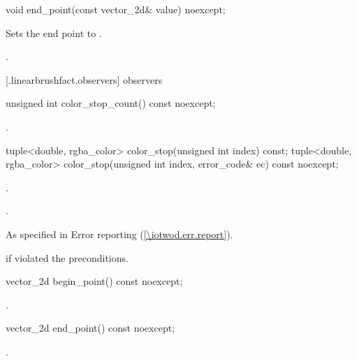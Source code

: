 \begin{itemdecl}
    void end_point(const vector_2d& value) noexcept;
\end{itemdecl}
\begin{itemdescr}
	\pnum
	\effects
	Sets the end point to .
	
	\pnum
	\postconditions
	.
	
\end{itemdescr}

 [\iotwod.linearbrushfact.observers] { observers}

\begin{itemdecl}
    unsigned int color_stop_count() const noexcept;
\end{itemdecl}
\begin{itemdescr}
	\pnum
	\returns
	.

\end{itemdescr}

\begin{itemdecl}
    tuple<double, rgba_color> color_stop(unsigned int index) const;
    tuple<double, rgba_color> color_stop(unsigned int index,
      error_code& ec) const noexcept;
\end{itemdecl}
\begin{itemdescr}
	\pnum
	\requires
	.
	
	\pnum
	\returns
	.

	\pnum
	\throws
	As specified in Error reporting (\ref{\iotwod.err.report}).
	
	\pnum
	\errors
	 if  violated the preconditions.

\end{itemdescr}

\begin{itemdecl}
    vector_2d begin_point() const noexcept;
\end{itemdecl}
\begin{itemdescr}
	\pnum
	\returns
	.

\end{itemdescr}

\begin{itemdecl}
    vector_2d end_point() const noexcept;
\end{itemdecl}
\begin{itemdescr}
	\pnum
	\returns
	.

\end{itemdescr}
